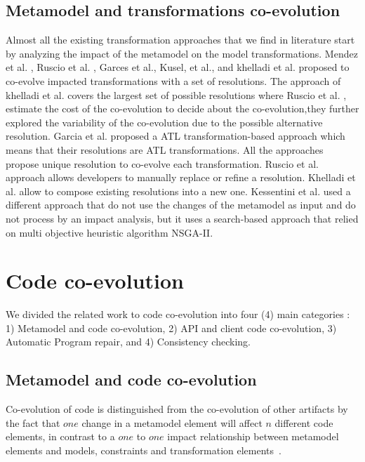 
\subsection{Metamodel and transformations co-evolution}

Almost all the existing transformation approaches that we find in literature start by analyzing the impact of the metamodel on the model transformations.
Mendez et al. \cite{mendez2010towards}, Ruscio et al. \cite{di2011needed}, Garces et al.\cite{garces2014adapting}, Kusel, et al.\cite{kusel2015consistent}, and khelladi et al. \cite{khelladi2018change} proposed to co-evolve impacted transformations with a set of resolutions. The approach of khelladi et al. \cite{khelladi2018change} covers the largest set of possible resolutions where Ruscio et al. \cite{di2011needed}, estimate the cost of the co-evolution to decide about the co-evolution,they further explored the variability of the co-evolution due to the possible alternative resolution. Garcia et al.\cite{garcia2012model} proposed a ATL transformation-based approach which means that their resolutions are ATL transformations. All the approaches propose unique resolution to co-evolve each transformation.
Ruscio et al. \cite{di2011needed} approach allows developers to manually replace or refine a resolution. Khelladi et al. \cite{khelladi2018change}  allow to compose existing resolutions into a new one. Kessentini et al. \cite{kessentini2018automated} used a different approach that do not use the changes of the metamodel as input and do not process by an impact analysis, but it uses a search-based approach that relied on multi objective heuristic algorithm NSGA-II.
 \section{Code co-evolution}
 \label{coevolutioncode}
 We divided the related work to code co-evolution  into four (4) main categories : 1) Metamodel and code co-evolution, 2) API and client code co-evolution, 3) Automatic Program repair, and 4) Consistency checking. 
 \subsection{Metamodel and code co-evolution}
 Co-evolution of code is distinguished from the co-evolution of other artifacts by the fact that $one$ change in a metamodel element will affect $n$ different code elements, in contrast to a $one$ to $one$ impact relationship between metamodel elements and models, constraints and transformation elements~\cite{kessentini2018integrating,kessentini2019automated,cicchetti2008automating,herrmannsdoerfer2009cope,garces2009managing,wachsmuth2007metamodel,batot2017heuristic,khelladi2017semi,correa2007refactoring,kessentini2018automated,khelladi2018change,garces2014adapting,10.1007/978-3-642-36089-3_9,kusel2015consistent,kusel2015systematic}.
 
